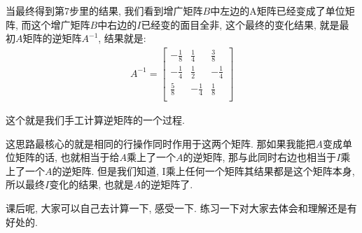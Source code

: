 当最终得到第7步里的结果, 我们看到增广矩阵$B$中左边的A矩阵已经变成了单位矩阵, 而这个增广矩阵$B$中右边的$I$已经变的面目全非, 这个最终的变化结果, 就是最初$A$矩阵的逆矩阵$A^{-1}$, 结果就是:
\begin{align*}
A^{-1} = \begin{bmatrix} 
-\frac{1}{8} & \frac{1}{4} & \frac{3}{8} \\
-\frac{1}{4} & \frac{1}{2} & -\frac{1}{4} \\
\frac{5}{8} & -\frac{1}{4} & \frac{1}{8} \\
\end{bmatrix}
\end{align*}

这个就是我们手工计算逆矩阵的一个过程. 

这思路最核心的就是相同的行操作同时作用于这两个矩阵. 那如果我能把$A$变成单位矩阵的话, 也就相当于给$A$乘上了一个$A$的逆矩阵, 那与此同时右边也相当于$I$乘上了一个$A$的逆矩阵. 但是我们知道, I乘上任何一个矩阵其结果都是这个矩阵本身, 所以最终$I$变化的结果, 也就是$A$的逆矩阵了. 

课后呢, 大家可以自己去计算一下, 感受一下. 练习一下对大家去体会和理解还是有好处的. 